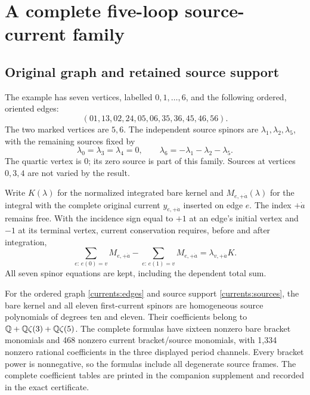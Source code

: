 \section{A complete five-loop source-current family}
\label{currents:family}

\subsection{Original graph and retained source support}

The example has seven vertices, labelled $0,1,\ldots,6$, and the following
ordered, oriented edges:
\begin{equation}
 (01,13,02,24,05,06,35,36,45,46,56).
 \label{currents:edges}
\end{equation}
The two marked vertices are $5,6$. The independent source spinors are
$\lambda_1,\lambda_2,\lambda_5$, with the remaining sources fixed by
\begin{equation}
 \lambda_0=\lambda_3=\lambda_4=0,\qquad
 \lambda_6=-\lambda_1-\lambda_2-\lambda_5.
 \label{currents:sources}
\end{equation}
The quartic vertex is $0$; its zero source is part of this family.
Sources at vertices $0,3,4$ are not varied by the result.

Write $K(\lambda)$ for the normalized integrated bare kernel and
$M_{e,+\dot a}(\lambda)$ for the integral with the complete original
current $y_{e,+\dot a}$ inserted on edge $e$. The index $+\dot a$
remains free. With the incidence sign equal to $+1$ at an edge's
initial vertex and $-1$ at its terminal vertex, current conservation
requires, before and after integration,
\begin{equation}
 \sum_{e:\,e(0)=v}M_{e,+\dot a}
 -\sum_{e:\,e(1)=v}M_{e,+\dot a}
 =\lambda_{v,+\dot a}K.
 \label{currents:conservation}
\end{equation}
All seven spinor equations are kept, including the dependent total sum.

\begin{theorem}
\label{currents:complete}
For the ordered graph \eqref{currents:edges} and source support
\eqref{currents:sources}, the bare kernel and all eleven first-current
spinors are homogeneous source polynomials of degrees ten and eleven.
Their coefficients belong to $\mathbb{Q}+\mathbb{Q}\zeta(3)+\mathbb{Q}\zeta(5)$. The complete
formulas have sixteen nonzero bare bracket monomials and 468 nonzero
current bracket/source monomials, with 1,334 nonzero rational
coefficients in the three displayed period channels. Every bracket
power is nonnegative, so the formulas include all degenerate source
frames. The complete coefficient tables are printed in the companion
supplement and recorded in the exact certificate.
\end{theorem}

